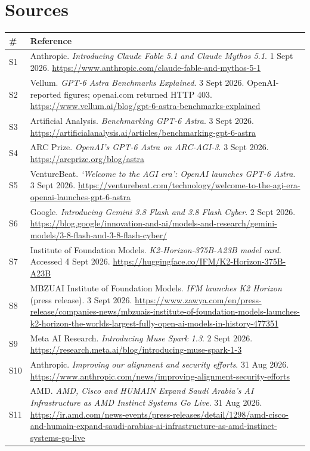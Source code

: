 \documentclass[11pt,a4paper]{article}
\begin{document}
\section{Sources}
{\footnotesize
\begin{tabularx}{\textwidth}{@{}l X@{}}
\toprule
\textbf{\#} & \textbf{Reference} \\
\midrule
S1 & Anthropic. \emph{Introducing Claude Fable 5.1 and Claude Mythos 5.1}. 1 Sept 2026. \url{https://www.anthropic.com/claude-fable-and-mythos-5-1} \\
S2 & Vellum. \emph{GPT-6 Astra Benchmarks Explained}. 3 Sept 2026. OpenAI-reported figures; openai.com returned HTTP 403. \url{https://www.vellum.ai/blog/gpt-6-astra-benchmarks-explained} \\
S3 & Artificial Analysis. \emph{Benchmarking GPT-6 Astra}. 3 Sept 2026. \url{https://artificialanalysis.ai/articles/benchmarking-gpt-6-astra} \\
S4 & ARC Prize. \emph{OpenAI's GPT-6 Astra on ARC-AGI-3}. 3 Sept 2026. \url{https://arcprize.org/blog/astra} \\
S5 & VentureBeat. \emph{`Welcome to the AGI era': OpenAI launches GPT-6 Astra}. 3 Sept 2026. \url{https://venturebeat.com/technology/welcome-to-the-agi-era-openai-launches-gpt-6-astra} \\
S6 & Google. \emph{Introducing Gemini 3.8 Flash and 3.8 Flash Cyber}. 2 Sept 2026. \url{https://blog.google/innovation-and-ai/models-and-research/gemini-models/3-8-flash-and-3-8-flash-cyber/} \\
S7 & Institute of Foundation Models. \emph{K2-Horizon-375B-A23B model card}. Accessed 4 Sept 2026. \url{https://huggingface.co/IFM/K2-Horizon-375B-A23B} \\
S8 & MBZUAI Institute of Foundation Models. \emph{IFM launches K2 Horizon} (press release). 3 Sept 2026. \url{https://www.zawya.com/en/press-release/companies-news/mbzuais-institute-of-foundation-models-launches-k2-horizon-the-worlds-largest-fully-open-ai-models-in-history-477351} \\
S9 & Meta AI Research. \emph{Introducing Muse Spark 1.3}. 2 Sept 2026. \url{https://research.meta.ai/blog/introducing-muse-spark-1-3} \\
S10 & Anthropic. \emph{Improving our alignment and security efforts}. 31 Aug 2026. \url{https://www.anthropic.com/news/improving-alignment-security-efforts} \\
S11 & AMD. \emph{AMD, Cisco and HUMAIN Expand Saudi Arabia's AI Infrastructure as AMD Instinct Systems Go Live}. 31 Aug 2026. \url{https://ir.amd.com/news-events/press-releases/detail/1298/amd-cisco-and-humain-expand-saudi-arabias-ai-infrastructure-as-amd-instinct-systems-go-live} \\

\end{tabularx}}
\end{document}
